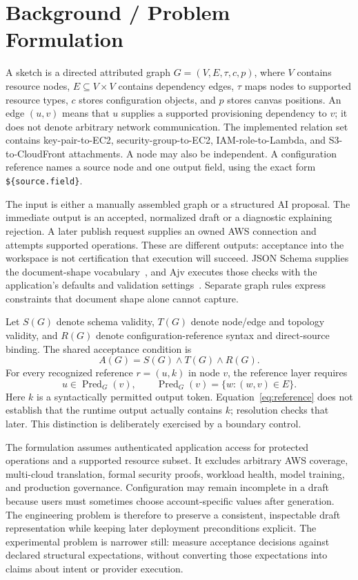 \section{Background / Problem Formulation}
A sketch is a directed attributed graph $G=(V,E,\tau,c,p)$, where $V$ contains resource nodes, $E\subseteq V\times V$ contains dependency edges, $\tau$ maps nodes to supported resource types, $c$ stores configuration objects, and $p$ stores canvas positions. An edge $(u,v)$ means that $u$ supplies a supported provisioning dependency to $v$; it does not denote arbitrary network communication. The implemented relation set contains key-pair-to-EC2, security-group-to-EC2, IAM-role-to-Lambda, and S3-to-CloudFront attachments. A node may also be independent. A configuration reference names a source node and one output field, using the exact form \texttt{\$\{source.field\}}.

The input is either a manually assembled graph or a structured AI proposal. The immediate output is an accepted, normalized draft or a diagnostic explaining rejection. A later publish request supplies an owned AWS connection and attempts supported operations. These are different outputs: acceptance into the workspace is not certification that execution will succeed. JSON Schema supplies the document-shape vocabulary~\cite{jsonschema2022}, and Ajv executes those checks with the application's defaults and validation settings~\cite{ajv}. Separate graph rules express constraints that document shape alone cannot capture.

Let $S(G)$ denote schema validity, $T(G)$ denote node/edge and topology validity, and $R(G)$ denote configuration-reference syntax and direct-source binding. The shared acceptance condition is
\begin{equation}
 A(G)=S(G)\land T(G)\land R(G).
 \label{eq:accept}
\end{equation}
For every recognized reference $r=(u,k)$ in node $v$, the reference layer requires
\begin{equation}
 u\in\operatorname{Pred}_{G}(v),\qquad
 \operatorname{Pred}_{G}(v)=\{w:(w,v)\in E\}.
 \label{eq:reference}
\end{equation}
Here $k$ is a syntactically permitted output token. Equation~\ref{eq:reference} does not establish that the runtime output actually contains $k$; resolution checks that later. This distinction is deliberately exercised by a boundary control.

The formulation assumes authenticated application access for protected operations and a supported resource subset. It excludes arbitrary AWS coverage, multi-cloud translation, formal security proofs, workload health, model training, and production governance. Configuration may remain incomplete in a draft because users must sometimes choose account-specific values after generation. The engineering problem is therefore to preserve a consistent, inspectable draft representation while keeping later deployment preconditions explicit. The experimental problem is narrower still: measure acceptance decisions against declared structural expectations, without converting those expectations into claims about intent or provider execution.
